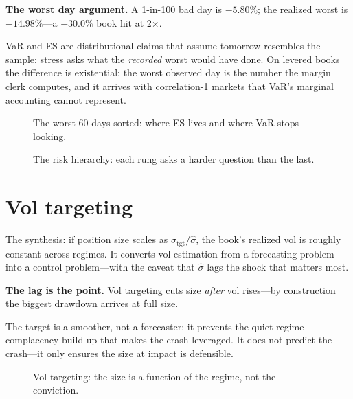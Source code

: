 \begin{example}\label{ex:stress}
\textbf{The worst day argument.} A 1-in-100 bad day is $-5.80\%$; the realized worst is
$-14.98\%$---a $-30.0\%$ book hit at 2$\times$.
\begin{solution}
VaR and ES are distributional claims that assume tomorrow resembles the sample; stress
asks what the \emph{recorded} worst would have done. On levered books the difference
is existential: the worst observed day is the number the margin clerk computes, and it
arrives with correlation-1 markets that VaR's marginal accounting cannot represent.
\end{solution}
\end{example}

\begin{figure}[htbp]\centering

\caption{The worst 60 days sorted: where ES lives and where VaR stops looking.}
\label{fig:tail}
\end{figure}

\begin{figure}[htbp]\centering

\caption{The risk hierarchy: each rung asks a harder question than the last.}
\label{fig:levels}
\end{figure}

\section{Vol targeting}\label{sec:voltgt}

The synthesis: if position size scales as $\sigma_{\text{tgt}}/\hat\sigma$, the book's
realized vol is roughly constant across regimes. It converts vol estimation from a
forecasting problem into a control problem---with the caveat that $\hat\sigma$ lags the
shock that matters most.

\begin{example}\label{ex:voltgt}
\textbf{The lag is the point.} Vol targeting cuts size \emph{after} vol rises---by
construction the biggest drawdown arrives at full size.
\begin{solution}
The target is a smoother, not a forecaster: it prevents the quiet-regime complacency
build-up that makes the crash leveraged. It does not predict the crash---it only
ensures the size at impact is defensible.
\end{solution}
\end{example}

\begin{figure}[htbp]\centering

\caption{Vol targeting: the size is a function of the regime, not the conviction.}
\label{fig:voltgt}
\end{figure}

